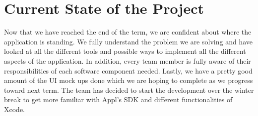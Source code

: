 \documentclass[onecolumn, draftclsnofoot,10pt, compsoc]{IEEEtran}
\begin{document}
\section{Current State of the Project}

Now that we have reached the end of the term, we are confident about where the application is standing. We fully understand the problem we are solving and have looked at all the different tools and possible ways to implement all the different aspects of the application. In addition, every team member is fully aware of their responsibilities of each software component needed. Lastly, we have a pretty good amount of the UI mock ups done which we are hoping to complete as we progress toward next term. The team has decided to start the development over the winter break to get more familiar with Appl's SDK and different functionalities of Xcode.
\end{document}
